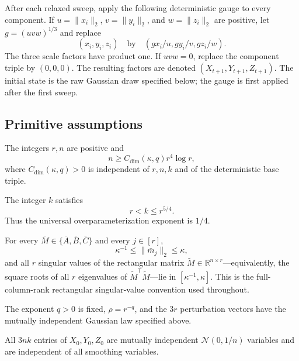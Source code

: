 After each relaxed sweep, apply the following deterministic gauge to every
component.  If $u=\|x_i\|_2$, $v=\|y_i\|_2$, and $w=\|z_i\|_2$ are
positive, let $g=(uvw)^{1/3}$ and replace
\[
(x_i,y_i,z_i)
\quad\text{by}\quad
(gx_i/u,gy_i/v,gz_i/w).
\]
The three scale factors have product one.  If $uvw=0$, replace the component
triple by $(0,0,0)$.  The resulting factors are denoted
$(X_{t+1},Y_{t+1},Z_{t+1})$.  The initial state is the raw Gaussian draw
specified below; the gauge is first applied after the first sweep.

\subsection{Primitive assumptions}

\begin{assumption}\label{assump:dimension}
The integers $r,n$ are positive and
\[
n\geq C_{\mathrm{dim}}(\kappa,q)r^4\log r,
\]
where $C_{\mathrm{dim}}(\kappa,q)>0$ is independent of $r,n,k$ and of
the deterministic base triple.
\end{assumption}

\begin{assumption}\label{assump:rank_window}
The integer $k$ satisfies
\[
r<k\leq r^{5/4}.
\]
Thus the universal overparameterization exponent is $1/4$.
\end{assumption}

\begin{assumption}\label{assump:base_conditioning}
For every $\bar M\in\{\bar A,\bar B,\bar C\}$ and every $j\in[r]$,
\[
\kappa^{-1}\leq\|\bar m_j\|_2\leq\kappa,
\]
and all $r$ singular values of the rectangular matrix
$\widetilde M\in\mathbb R^{n\times r}$---equivalently, the square roots
of all $r$ eigenvalues of $\widetilde M^{\mathsf T}\widetilde M$---lie in
$[\kappa^{-1},\kappa]$.  This is the full-column-rank rectangular
singular-value convention used throughout.
\end{assumption}

\begin{assumption}\label{assump:gaussian_smoothing}
The exponent $q>0$ is fixed, $\rho=r^{-q}$, and the $3r$ perturbation
vectors have the mutually independent Gaussian law specified above.
\end{assumption}

\begin{assumption}\label{assump:independent_initialization}
All $3nk$ entries of $X_0,Y_0,Z_0$ are mutually independent
$\mathcal N(0,1/n)$ variables and are independent of all smoothing
variables.
\end{assumption}

